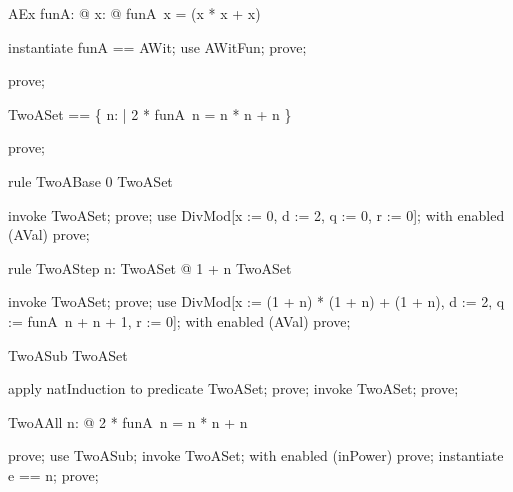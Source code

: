 \documentclass{article}
\begin{document}
\begin{theorem}{AEx}
  \exists funA: \nat \fun \nat @ \forall x: \nat @ funA~x = (x * x + x) 
\end{theorem}

\begin{zproof}
instantiate funA == AWit;
use AWitFun;
prove;
\end{zproof}

\begin{zproof}
prove;
\end{zproof}

\begin{zed}
  TwoASet == \{ n: \nat | 2 * funA~n = n * n + n \}
\end{zed}

\begin{zproof}
prove;
\end{zproof}

\begin{theorem}{rule TwoABase}
  0 \in TwoASet
\end{theorem}

\begin{zproof}
invoke TwoASet;
prove;
use DivMod[x := 0, d := 2, q := 0, r := 0];
with enabled (AVal) prove;
\end{zproof}

\begin{theorem}{rule TwoAStep}
  \forall n: TwoASet @ 1 + n \in TwoASet
\end{theorem}

\begin{zproof}
invoke TwoASet;
prove;
use DivMod[x := (1 + n) * (1 + n) + (1 + n), d := 2, q := funA~n + n + 1, r := 0];
with enabled (AVal) prove;
\end{zproof}

\begin{theorem}{TwoASub}
  \nat \subseteq TwoASet
\end{theorem}

\begin{zproof}
apply natInduction to predicate \nat \subseteq TwoASet;
prove;
invoke TwoASet;
prove;
\end{zproof}

\begin{theorem}{TwoAAll}
  \forall n: \nat @ 2 * funA~n = n * n + n
\end{theorem}

\begin{zproof}
prove;
use TwoASub;
invoke TwoASet;
with enabled (inPower) prove;
instantiate e == n;
prove;
\end{zproof}
\end{document}
